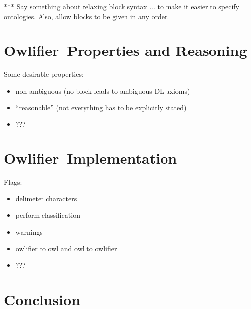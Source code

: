 \documentclass[preprint,number]{elsarticle}
\newcommand{\owlifier}{Owlifier}
\begin{document}
*** Say something about relaxing block syntax ... to make it easier to
specify ontologies. Also, allow blocks to be given in any order.


\section{\owlifier\ Properties and Reasoning}
\label{sec:properties}


Some desirable properties: 
\begin{itemize}
\item non-ambiguous (no block leads to ambiguous DL axioms)
\item ``reasonable'' (not everything has to be explicitly stated)
\item ???
\end{itemize}

\section{\owlifier\ Implementation}
\label{sec:implementation}

Flags: 
\begin{itemize}
\item delimeter characters 
\item perform classification
\item warnings
\item owlifier to owl and owl to owlifier
\item ??? 
\end{itemize}


\section{Conclusion}
\label{sec:conclusion}



%


\end{document}

